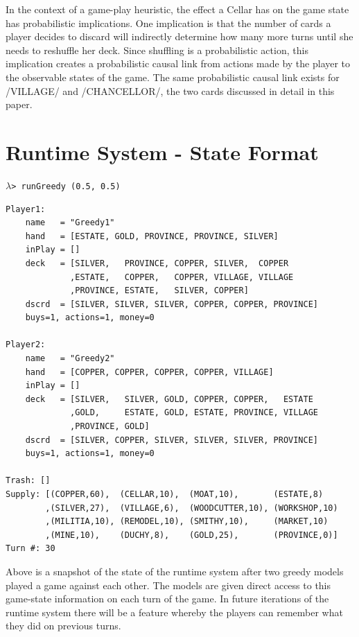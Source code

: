In the context of a game-play heuristic, the effect a Cellar has on the game state
has probabilistic implications. One implication is that the number of cards a
player decides to discard will indirectly determine how many more turns until
she needs to reshuffle her deck. Since shuffling is a probabilistic action, this
implication creates a probabilistic causal link from actions made by the player
to the observable states of the game.
The same probabilistic causal link exists for \hsk/VILLAGE/ and \hsk/CHANCELLOR/,
the two cards discussed in detail in this paper.

\newpage

\section{Runtime System - State Format} \label{appendix:dominion-state-format}
\begin{small}
$\lambda$\verb|> runGreedy (0.5, 0.5)|
\end{small}
\begin{Verbatim}[fontsize=\small]
Player1:
    name   = "Greedy1"
    hand   = [ESTATE, GOLD, PROVINCE, PROVINCE, SILVER]
    inPlay = []
    deck   = [SILVER,   PROVINCE, COPPER, SILVER,  COPPER
             ,ESTATE,   COPPER,   COPPER, VILLAGE, VILLAGE
             ,PROVINCE, ESTATE,   SILVER, COPPER]
    dscrd  = [SILVER, SILVER, SILVER, COPPER, COPPER, PROVINCE]
    buys=1, actions=1, money=0

Player2:
    name   = "Greedy2"
    hand   = [COPPER, COPPER, COPPER, COPPER, VILLAGE]
    inPlay = []
    deck   = [SILVER,   SILVER, GOLD, COPPER, COPPER,   ESTATE
             ,GOLD,     ESTATE, GOLD, ESTATE, PROVINCE, VILLAGE
             ,PROVINCE, GOLD]
    dscrd  = [SILVER, COPPER, SILVER, SILVER, SILVER, PROVINCE]
    buys=1, actions=1, money=0

Trash: []
Supply: [(COPPER,60),  (CELLAR,10),  (MOAT,10),       (ESTATE,8)
        ,(SILVER,27),  (VILLAGE,6),  (WOODCUTTER,10), (WORKSHOP,10)
        ,(MILITIA,10), (REMODEL,10), (SMITHY,10),     (MARKET,10)
        ,(MINE,10),    (DUCHY,8),    (GOLD,25),       (PROVINCE,0)]
Turn #: 30
\end{Verbatim}

Above is a snapshot of the state of the runtime system after two
greedy models played a game against each other.
The models are given direct access to this game-state information
on each turn of the game. In future iterations of the runtime system
there will be a feature whereby the players can remember what
they did on previous turns.

